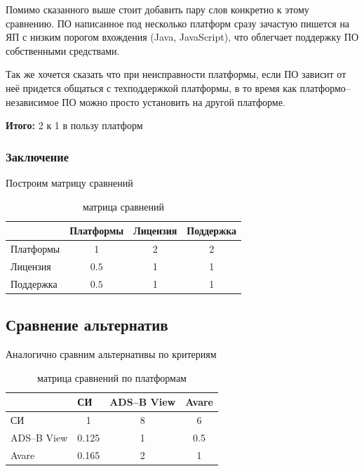 \documentclass[a4paper,12pt]{report} %
\begin{document}
Помимо сказанного выше стоит добавить пару слов конкретно к этому сравнению. ПО
написанное под несколько платформ сразу зачастую пишется на ЯП с низким порогом
вхождения (Java, JavaScript), что облегчает поддержку ПО собственными
средствами.

Так же хочется сказать что при неисправности платформы, если ПО зависит от неё
придется общаться с техподдержкой платформы, в то время как платформо--независимое
ПО можно просто установить на другой платформе.

\textbf{Итого:} 2 к 1 в пользу платформ

\subsubsection{Заключение}

Построим матрицу сравнений
\begin{table}[h]
  \caption{матрица сравнений}
  \begin{tabular}{l|c|c|c|}
    \cline{2-4}
    {}                              & \multicolumn{1}{l|}{Платформы} & \multicolumn{1}{l|}{Лицензия} & \multicolumn{1}{l|}{Поддержка} \\ \hline
    \multicolumn{1}{|l|}{Платформы} & 1                              & 2                             & 2                              \\ \hline
    \multicolumn{1}{|l|}{Лицензия}  & $0.5$                          & 1                             & 1                              \\ \hline
    \multicolumn{1}{|l|}{Поддержка} & $0.5$                          & 1                             & 1                              \\ \hline
  \end{tabular}
\end{table}

\subsection{Сравнение альтернатив}
Аналогично сравним альтернативы по критериям

\begin{table}[h]
  \caption{матрица сравнений по платформам}
  \begin{tabular}{l|c|c|c|}
    \cline{2-4}
    {}                               & \multicolumn{1}{l|}{СИ}        & \multicolumn{1}{l|}{ADS--B View} & \multicolumn{1}{l|}{Avare} \\ \hline
    \multicolumn{1}{|l|}{СИ}         & 1                              & 8                               & 6                          \\ \hline
    \multicolumn{1}{|l|}{ADS--B View} & 0.125                          & 1                               & 0.5                        \\ \hline
    \multicolumn{1}{|l|}{Avare}      & 0.165                          & 2                               & 1                          \\ \hline
  \end{tabular}
\end{table}
\end{document}
